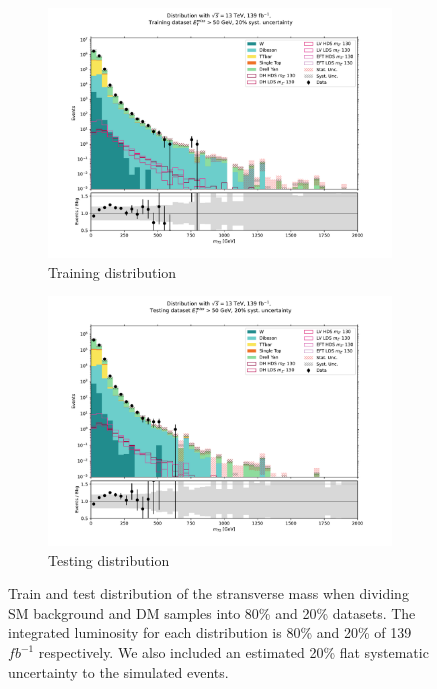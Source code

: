 \documentclass[12pt, a4paper]{book}
\begin{document}
\begin{figure}[!ht]
	\centering
	\begin{subfigure}[b]{0.49\textwidth}
        \centering
        \includegraphics[width=1\textwidth]{mt2_train.pdf}
        \caption{Training distribution}
     \end{subfigure}
     \hfill
     \begin{subfigure}[b]{0.49\textwidth}
        \centering
        \includegraphics[width=1\textwidth]{mt2_test.pdf}
        \caption{Testing distribution}
     \end{subfigure}
	\caption[Train-test split distribution]{Train and test distribution of the stransverse mass when dividing SM background and DM samples into 80\% and 20\% datasets. The integrated luminosity for each distribution is 80\% and 20\% of 139 $fb^{-1}$ respectively. We also included an estimated 20\% flat systematic uncertainty to the simulated events.}\label{fig:train-test}
\end{figure}
\end{document}
